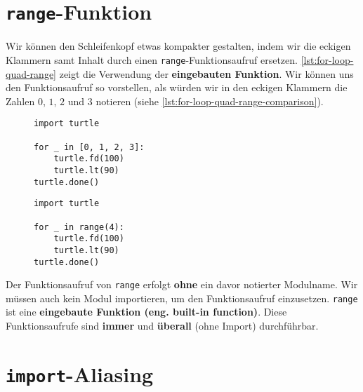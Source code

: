 \section{\lstinline[language={python3}]{range}-Funktion}
\label{sec:range-Funktion}

Wir können den Schleifenkopf etwas kompakter gestalten, indem wir die eckigen Klammern samt Inhalt durch einen \lstinline[language={python3}]{range}-Funktionsaufruf ersetzen. \autoref{lst:for-loop-quad-range} zeigt die Verwendung der \textbf{eingebauten Funktion}. Wir können uns den Funktionsaufruf so vorstellen, als würden wir in den eckigen Klammern die Zahlen $0$, $1$, $2$ und $3$ notieren (siehe \autoref{lst:for-loop-quad-range-comparison}).

\begin{figure}[htb]
\centering
\begin{minipage}{0.45\textwidth}
\centering
\begin{lstlisting}[language={python3}, caption={Eingangsbeispiel}, label={lst:for-loop-quad-range-comparison}]
import turtle

for _ in [0, 1, 2, 3]:
	turtle.fd(100)
	turtle.lt(90)
turtle.done()
\end{lstlisting}
\end{minipage}
\hfill
\begin{minipage}{0.45\textwidth}
\centering
\begin{lstlisting}[language={python3}, caption={Erste Verbesserung.}, label={lst:for-loop-quad-range}]
import turtle

for _ in range(4):
	turtle.fd(100)
	turtle.lt(90)
turtle.done()
\end{lstlisting}
\end{minipage}

\end{figure}

\begin{important}
Der Funktionsaufruf von \lstinline[language={python3}]{range} erfolgt \textbf{ohne} ein davor notierter Modulname. Wir müssen auch kein Modul importieren, um den Funktionsaufruf einzusetzen. \lstinline[language={python3}]{range} ist eine \textbf{eingebaute Funktion (eng. built-in function)}. Diese Funktionsaufrufe sind \textbf{immer} und \textbf{überall} (ohne Import) durchführbar.
\end{important}

\section{\lstinline[language={python3}]{import}-Aliasing}
\label{sec:import-aliasing}

